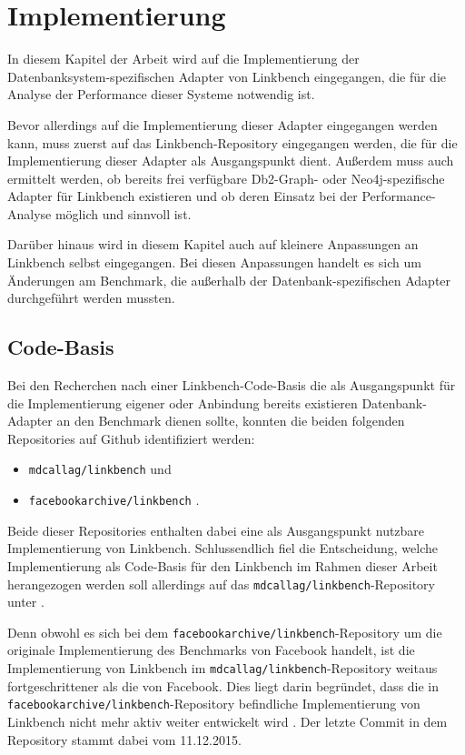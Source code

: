 \chapter{Implementierung}
\label{implementierung}
In diesem Kapitel der Arbeit wird auf die Implementierung der Datenbanksystem-spezifischen Adapter von Linkbench eingegangen, die für die Analyse der Performance dieser Systeme notwendig ist. 

Bevor allerdings auf die Implementierung dieser Adapter eingegangen werden kann, muss zuerst auf das Linkbench-Repository eingegangen werden, die für die Implementierung dieser Adapter als Ausgangspunkt dient. Außerdem muss auch ermittelt werden, ob bereits frei verfügbare Db2-Graph- oder Neo4j-spezifische Adapter für Linkbench existieren und ob deren Einsatz bei der Performance-Analyse möglich und sinnvoll ist.

Darüber hinaus wird in diesem Kapitel auch auf kleinere Anpassungen an Linkbench selbst eingegangen. Bei diesen Anpassungen handelt es sich um Änderungen am Benchmark, die außerhalb der Datenbank-spezifischen Adapter durchgeführt werden mussten.

\section{Code-Basis}
\label{implementierung:basis}
Bei den Recherchen nach einer Linkbench-Code-Basis die als Ausgangspunkt für die Implementierung eigener oder Anbindung bereits existieren Datenbank-Adapter an den Benchmark dienen sollte, konnten die beiden folgenden Repositories auf Github identifiziert werden:
\begin{itemize}
    \item \texttt{mdcallag/linkbench} \cite{mc_linkbench_github} und 
    \item \texttt{facebookarchive/linkbench} \cite{fb_linkbench_github}.
\end{itemize}
Beide dieser Repositories enthalten dabei eine als Ausgangspunkt nutzbare Implementierung von Linkbench. Schlussendlich fiel die Entscheidung, welche Implementierung als Code-Basis für den Linkbench im Rahmen dieser Arbeit herangezogen werden soll allerdings auf das \texttt{mdcallag/linkbench}-Repository unter \cite{mc_linkbench_github}. 

Denn obwohl es sich bei dem \texttt{facebookarchive/linkbench}-Repository um die originale Implementierung des Benchmarks von Facebook handelt, ist die Implementierung von Linkbench im \texttt{mdcallag/linkbench}-Repository weitaus fortgeschrittener als die von Facebook. Dies liegt darin begründet, dass die in \texttt{facebookarchive\allowbreak /linkbench}-Repository befindliche Implementierung von Linkbench nicht mehr aktiv weiter entwickelt wird \cite{fb_linkbench_github}. Der letzte Commit in dem Repository stammt dabei vom 11.12.2015. 

